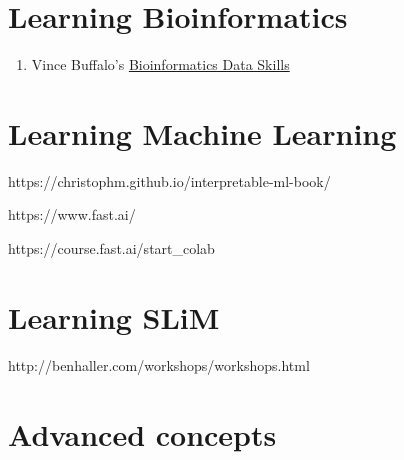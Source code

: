 \documentclass[
  letterpaper,
  DIV=11,
  numbers=noendperiod]{scrreprt}
\providecommand{\tightlist}{%
  \setlength{\itemsep}{0pt}\setlength{\parskip}{0pt}}\usepackage{longtable,booktabs,array}
\begin{document}
\hypertarget{learning-bioinformatics}{%
\section*{\texorpdfstring{\textbf{Learning
Bioinformatics}}{Learning Bioinformatics}}\label{learning-bioinformatics}}


\begin{enumerate}
\def\labelenumi{\arabic{enumi}.}
\tightlist
\item
  Vince Buffalo's \href{https://vincebuffalo.com/book/}{Bioinformatics
  Data Skills}
\end{enumerate}

\hypertarget{learning-machine-learning}{%
\section*{\texorpdfstring{\textbf{Learning Machine
Learning}}{Learning Machine Learning}}\label{learning-machine-learning}}


https://christophm.github.io/interpretable-ml-book/

https://www.fast.ai/

https://course.fast.ai/start\_colab

\hypertarget{learning-slim}{%
\section*{\texorpdfstring{\textbf{Learning
SLiM}}{Learning SLiM}}\label{learning-slim}}


http://benhaller.com/workshops/workshops.html

\hypertarget{advanced-concepts}{%
\section*{\texorpdfstring{\textbf{Advanced
concepts}}{Advanced concepts}}\label{advanced-concepts}}

\end{document}
